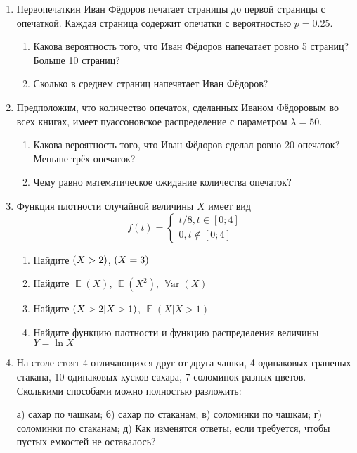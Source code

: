 \documentclass[10pt,a4paper]{article}
\DeclareMathOperator{\E}{\mathbb{E}}
\let\P\relax
\DeclareMathOperator{\P}{\mathbb{P}}
\DeclareMathOperator{\Var}{\mathbb{V}ar}
\begin{document}
\begin{enumerate}
\item Первопечаткин Иван Фёдоров печатает страницы до первой страницы с опечаткой. Каждая страница содержит опечатки с вероятностью $p=0.25$.

\begin{enumerate}
  \item Какова вероятность того, что Иван Фёдоров напечатает ровно 5 страниц? Больше 10 страниц?
  \item Сколько в среднем страниц напечатает Иван Фёдоров?
\end{enumerate}

\item Предположим, что количество опечаток, сделанных Иваном Фёдоровым во всех книгах, имеет пуассоновское распределение с параметром $\lambda = 50$.
\begin{enumerate}
  \item Какова вероятность того, что Иван Фёдоров сделал ровно 20 опечаток? Меньше трёх опечаток?
  \item Чему равно математическое ожидание количества опечаток?
\end{enumerate}


\item Функция плотности случайной величины $X$ имеет вид
\[
f(t)=
\begin{cases}
  t/8, t\in [0;4] \\
  0, t\notin [0;4]
\end{cases}
\]


\begin{enumerate}
  \item Найдите $\P(X>2)$, $\P(X=3)$
  \item Найдите $\E(X)$, $\E(X^2)$, $\Var(X)$
  \item Найдите $\P(X>2 | X>1)$, $\E(X|X>1)$
  \item Найдите функцию плотности и функцию распределения величины $Y=\ln X$
\end{enumerate}


\item На столе стоят 4 отличающихся друг от друга чашки, 4 одинаковых граненых стакана, 10 одинаковых кусков сахара, 7 соломинок разных цветов. Сколькими способами можно полностью разложить:

а) сахар по чашкам; б) сахар по стаканам; в) соломинки по чашкам; г) соломинки по стаканам;
д) Как изменятся ответы, если требуется, чтобы пустых емкостей не оставалось?




\end{enumerate}
\end{document}
